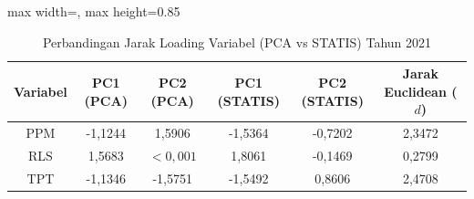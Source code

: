 \begin{table}[H]
\centering
\caption{Perbandingan Jarak Loading Variabel (PCA vs STATIS) Tahun 2021} \label{tab:sample2jarak_loading_2021}
\begin{adjustbox}{max width=\textwidth, max height=0.85\textheight}
\begin{tabular}{|c|c|c|c|c|c|}
\hline
\textbf{Variabel} & \textbf{PC1 (PCA)} & \textbf{PC2 (PCA)} & \textbf{PC1 (STATIS)} & \textbf{PC2 (STATIS)} & \textbf{Jarak Euclidean ($d$)} \\
\hline
PPM & -1,1244 & 1,5906 & -1,5364 & -0,7202 & 2,3472 \\
RLS & 1,5683 & $< 0,001$ & 1,8061 & -0,1469 & 0,2799 \\
TPT & -1,1346 & -1,5751 & -1,5492 & 0,8606 & 2,4708 \\
\hline
\end{tabular}
\end{adjustbox}
\end{table}